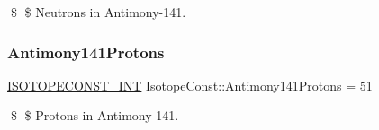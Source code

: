 \$ \$ Neutrons in Antimony-\/141. \mbox{\label{group___isotope_const-_antimony-_sb141_gaacfc03e2b45d52a170a194e42678b988}} 
\subsubsection{\texorpdfstring{Antimony141\+Protons}{Antimony141Protons}}
{\footnotesize\ttfamily \mbox{\hyperlink{group___isotope_const-_macros_ga5f18360b3e99483a35c32d789e62621c}{I\+S\+O\+T\+O\+P\+E\+C\+O\+N\+S\+T\+\_\+\+I\+NT}} Isotope\+Const\+::\+Antimony141\+Protons = 51}

\$ \$ Protons in Antimony-\/141. 